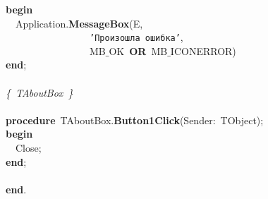 \mbox{}\textbf{begin} \\
\mbox{}\ \ Application.\textbf{MessageBox}(E, \\
\mbox{}\ \ \ \ \ \ \ \ \ \ \ \ \ \ \ \ \ \texttt{'Произошла\ ошибка'}, \\
\mbox{}\ \ \ \ \ \ \ \ \ \ \ \ \ \ \ \ \ MB$\_$OK\ \textbf{OR}\ MB$\_$ICONERROR) \\
\mbox{}\textbf{end}; \\
\mbox{} \\
\mbox{}\textit{\{\ TAboutBox\ \}} \\
\mbox{} \\
\mbox{}\textbf{procedure}\ TAboutBox.\textbf{Button1Click}(Sender:\ TObject); \\
\mbox{}\textbf{begin} \\
\mbox{}\ \ Close; \\
\mbox{}\textbf{end}; \\
\mbox{} \\
\mbox{}\textbf{end}. \\
\mbox{} \\
\mbox{}
